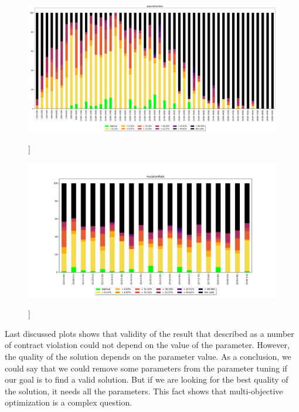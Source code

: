 \begin{figure}
	\centering
	\includegraphics[width=\textwidth]{images/populationSizeObjective.pdf}
	\caption[]]{}
	\label{fig:populationSizeObjective}
\end{figure}


\begin{figure}
	\centering
	\includegraphics[width=\textwidth]{images/mutationRateObjective.pdf}
	\caption[]]{}
	\label{fig:mutationRateObjective}
\end{figure}

Last discussed plots shows that validity of the result that described as a number of contract violation could not depend on the value of the parameter. However, the quality of the solution depends on the parameter value. As a conclusion, we could say that we could remove some parameters from the parameter tuning if our goal is to find a valid solution. But if we are looking for the best quality of the solution, it needs all the parameters. This fact shows that multi-objective optimization is a complex question.